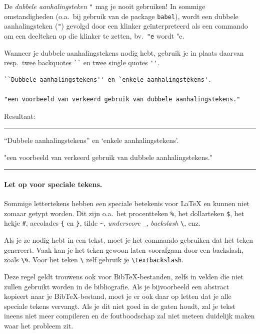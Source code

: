 De \emph{dubbele aanhalingsteken} \verb+"+ mag je nooit gebruiken! In sommige omstandigheden (o.a.\ bij gebruik van de package \texttt{babel}), wordt een dubbele aanhalingsteken (\verb+"+) gevolgd door een klinker geïnterpreteerd als een commando om een deelteken op die klinker te zetten, bv.\ \verb+"e+ wordt "e.

Wanneer je dubbele aanhalingstekens nodig hebt, gebruik je in plaats daarvan resp.\ twee backquotes \verb+``+ en twee single quotes \verb+''+.

\begin{verbatim}
``Dubbele aanhalingstekens'' en `enkele aanhalingstekens'.

"een voorbeeld van verkeerd gebruik van dubbele aanhalingstekens."
\end{verbatim}

Resultaat:

\rule{\textwidth}{0.4pt}

``Dubbele aanhalingstekens'' en `enkele aanhalingstekens'.

"een voorbeeld van verkeerd gebruik van dubbele aanhalingstekens."

\rule{\textwidth}{0.4pt}

\paragraph*{Let op voor speciale tekens.}

Sommige lettertekens hebben een speciale betekenis voor {\LaTeX} en kunnen niet zomaar getypt worden. Dit zijn o.a.\ het procentteken \verb+%+, het dollarteken \verb+$+, het hekje \verb+#+, accolades \verb+{+ en \verb+}+, tilde \verb+~+, \emph{underscore} \verb+_+, \emph{backslash} \verb+\+, enz.

Als je ze nodig hebt in een tekst, moet je het commando gebruiken dat het teken genereert. Vaak kan je het teken gewoon laten voorafgaan door een backslash, zoals \verb+\%+. Voor het teken \verb+\+ zelf gebruik je \verb+\textbackslash+.

Deze regel geldt trouwens ook voor Bib{\TeX}-bestanden, zelfs in velden die niet zullen gebruikt worden in de bibliografie. Als je bijvoorbeeld een abstract kopieert naar je Bib{\TeX}-bestand, moet je er ook daar op letten dat je alle speciale tekens vervangt. Als je dit niet goed in de gaten houdt, zal je tekst ineens niet meer compileren en de foutboodschap zal niet meteen duidelijk maken waar het probleem zit.

